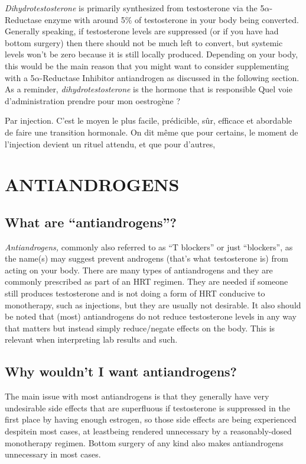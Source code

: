 \documentclass{article}
\begin{document}
\textit{Dihydrotestosterone} is primarily synthesized from testosterone via the 5$\alpha$-Reductase enzyme with around 5\% of testosterone in your body being converted. Generally speaking, if testosterone levels are suppressed (or if you have had bottom surgery) then there should not be much left to convert, but systemic levels won’t be zero because it is still locally produced. Depending on your body, this would be the main reason that you might want to consider supplementing with a 5$\alpha$-Reductase Inhibitor antiandrogen as discussed in the following section. As a reminder, \textit{dihydrotestosterone }is the hormone that is responsible Quel voie d'administration prendre pour mon oestrogène ?

Par injection. C'est le moyen le plus facile, prédicible, sûr, efficace et abordable de faire une transition hormonale. On dit même que pour certains, le moment de l'injection devient un rituel attendu, et que pour d'autres,  
\section{ANTIANDROGENS}\label{AA}

\subsection{What are “antiandrogens”?}

\textit{Antiandrogens, }commonly also referred to as “T blockers” or just “blockers”, as the name(s) may suggest prevent androgens (that’s what testosterone is) from acting on your body. There are many types of antiandrogens and they are commonly prescribed as part of an HRT regimen. They are needed if someone still produces testosterone and is not doing a form of HRT conducive to monotherapy, such as injections, but they are usually not desirable. It also should be noted that (most) antiandrogens do not reduce testosterone levels in any way that matters but instead simply reduce/negate effects on the body. This is relevant when interpreting lab results and such.

\subsection{Why wouldn’t I want antiandrogens?}

The main issue with most antiandrogens is that they generally have very undesirable side effects that are superfluous if testosterone is suppressed in the first place by having enough estrogen, so those side effects are being experienced despite\textemdash{}in most cases, at least\textemdash{}being rendered unnecessary by a reasonably-dosed monotherapy regimen. Bottom surgery of any kind also makes antiandrogens unnecessary in most cases.
\end{document}
